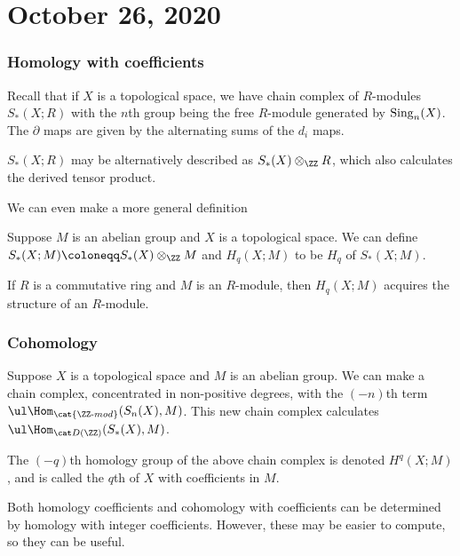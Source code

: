 \documentclass{standalone}
\begin{document}
\chapter{October 26, 2020}

\subsection{Homology with coefficients}
Recall that if \(X\) is a topological space,
we have chain complex of \(R\)-modules \(S_*(X; R)\) with
the \(n\)th group being the free \(R\)-module generated by \(\operatorname{Sing}_n(X)\).
The \(\partial\) maps are given by the alternating sums of the \(d_i\) maps.

\begin{note}
  \(S_*(X; R)\) may be alternatively described as \(S_*(X) \otimes_\ZZ R\),
  which also calculates the derived tensor product.
\end{note}

We can even make a more general definition
\begin{definition}
  Suppose \(M\) is an abelian group and \(X\) is a topological space.
  We can define \(S_*(X; M) \coloneqq S_*(X) \otimes_\ZZ M\)
  and \(H_q(X; M)\) to be \(H_q\) of \(S_*(X; M)\).
\end{definition}

If \(R\) is a commutative ring and \(M\) is an \(R\)-module,
then \(H_q(X; M)\) acquires the structure of an \(R\)-module.

\subsection{Cohomology}
Suppose \(X\) is a topological space and \(M\) is an abelian group.
We can make a chain complex, concentrated in non-positive degrees,
with the \((-n)\)th term
\(
  \ul\Hom_{\cat{\ZZ\text{-}mod}}(S_n(X), M) %
\).
This new chain complex calculates \(\ul\Hom_{\der(\ZZ)}(S_*(X), M)\).

\begin{definition}
  The \((-q)\)th homology group of the above chain complex is denoted
  \(H^q(X; M)\), and is called the \(q\)th 
  of \(X\) with coefficients in \(M\).
\end{definition}

Both homology coefficients and cohomology with coefficients can
be determined by homology with integer coefficients.
However, these may be easier to compute, so they can be useful.
\end{document}
